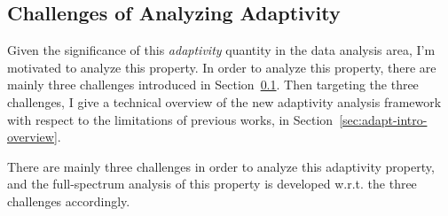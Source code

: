 \subsection{Challenges of Analyzing Adaptivity}
\label{sec:adapt-intro-challenge}
Given the significance of this \emph{adaptivity} quantity in the data analysis area,
I'm motivated to analyze this property.
In order to analyze this property, there are mainly three challenges introduced in Section~\ref{sec:adapt-intro-challenge}.
Then targeting the three challenges, I give a technical overview of the new adaptivity analysis framework
with respect to the limitations of previous works, in Section~\ref{sec:adapt-intro-overview}.

There are mainly three challenges in order to analyze this adaptivity property, 
and the full-spectrum analysis of this property is 
developed w.r.t. the three challenges accordingly.

